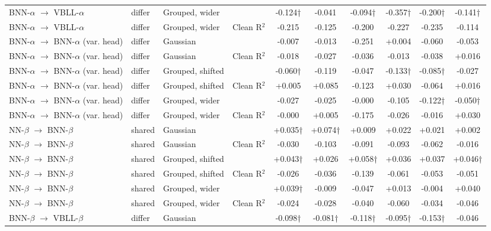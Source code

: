 \begin{landscape}
{\begin{longtable}{llllcccccc}
BNN-$\alpha$ $\rightarrow$ VBLL-$\alpha$ & differ & Grouped, wider & \aucnorm{} & -0.124† & -0.041 & -0.094† & -0.357† & -0.200† & -0.141† \\
BNN-$\alpha$ $\rightarrow$ VBLL-$\alpha$ & differ & Grouped, wider & Clean R$^2$ & -0.215 & -0.125 & -0.200 & -0.227 & -0.235 & -0.114 \\
BNN-$\alpha$ $\rightarrow$ BNN-$\alpha$ (var. head) & differ & Gaussian & \aucnorm{} & -0.007 & -0.013 & -0.251 & +0.004 & -0.060 & -0.053 \\
BNN-$\alpha$ $\rightarrow$ BNN-$\alpha$ (var. head) & differ & Gaussian & Clean R$^2$ & -0.018 & -0.027 & -0.036 & -0.013 & -0.038 & +0.016 \\
BNN-$\alpha$ $\rightarrow$ BNN-$\alpha$ (var. head) & differ & Grouped, shifted & \aucnorm{} & -0.060† & -0.119 & -0.047 & -0.133† & -0.085† & -0.027 \\
BNN-$\alpha$ $\rightarrow$ BNN-$\alpha$ (var. head) & differ & Grouped, shifted & Clean R$^2$ & +0.005 & +0.085 & -0.123 & +0.030 & -0.064 & +0.016 \\
BNN-$\alpha$ $\rightarrow$ BNN-$\alpha$ (var. head) & differ & Grouped, wider & \aucnorm{} & -0.027 & -0.025 & -0.000 & -0.105 & -0.122† & -0.050† \\
BNN-$\alpha$ $\rightarrow$ BNN-$\alpha$ (var. head) & differ & Grouped, wider & Clean R$^2$ & -0.000 & +0.005 & -0.175 & -0.026 & -0.016 & +0.030 \\
NN-$\beta$ $\rightarrow$ BNN-$\beta$ & shared & Gaussian & \aucnorm{} & +0.035† & +0.074† & +0.009 & +0.022 & +0.021 & +0.002 \\
NN-$\beta$ $\rightarrow$ BNN-$\beta$ & shared & Gaussian & Clean R$^2$ & -0.030 & -0.103 & -0.091 & -0.093 & -0.062 & -0.016 \\
NN-$\beta$ $\rightarrow$ BNN-$\beta$ & shared & Grouped, shifted & \aucnorm{} & +0.043† & +0.026 & +0.058† & +0.036 & +0.037 & +0.046† \\
NN-$\beta$ $\rightarrow$ BNN-$\beta$ & shared & Grouped, shifted & Clean R$^2$ & -0.026 & -0.036 & -0.139 & -0.061 & -0.053 & -0.051 \\
NN-$\beta$ $\rightarrow$ BNN-$\beta$ & shared & Grouped, wider & \aucnorm{} & +0.039† & -0.009 & -0.047 & +0.013 & -0.004 & +0.040 \\
NN-$\beta$ $\rightarrow$ BNN-$\beta$ & shared & Grouped, wider & Clean R$^2$ & -0.024 & -0.028 & -0.040 & -0.060 & -0.034 & -0.046 \\
BNN-$\beta$ $\rightarrow$ VBLL-$\beta$ & differ & Gaussian & \aucnorm{} & -0.098† & -0.081† & -0.118† & -0.095† & -0.153† & -0.046 \\

\end{longtable}}
\end{landscape}
